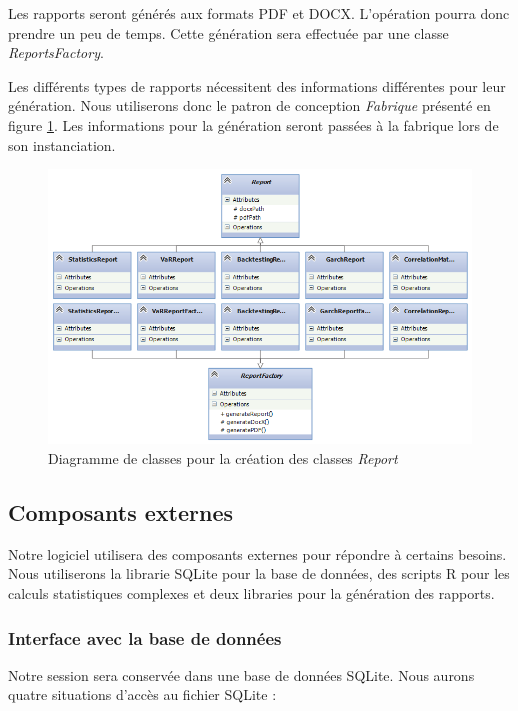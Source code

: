 \documentclass[a4paper,titlepage,french]{report}
\begin{document}
Les rapports seront générés aux formats PDF et DOCX.
L'opération pourra donc prendre un peu de temps.
Cette génération sera effectuée par une classe \textit{ReportsFactory}.

Les différents types de rapports nécessitent des informations différentes pour leur génération.
Nous utiliserons donc le patron de conception \textit{Fabrique} présenté en figure \ref{fig:diagramme-classes-reports-factory}.
Les informations pour la génération seront passées à la fabrique lors de son instanciation.

\begin{figure}
  	\center
  	\includegraphics[width=1\textwidth]{diagramme-classes-reports-factory.png}
  	\caption{Diagramme de classes pour la création des classes \textit{Report}}
  	\label{fig:diagramme-classes-reports-factory}
\end{figure}


\subsection{Composants externes}

Notre logiciel utilisera des composants externes pour répondre à certains besoins.
Nous utiliserons la librarie SQLite pour la base de données, des scripts R pour les calculs statistiques complexes et deux libraries pour la génération des rapports.

\subsubsection{Interface avec la base de données}

Notre session sera conservée dans une base de données SQLite.
Nous aurons quatre situations d'accès au fichier SQLite :
\end{document}
